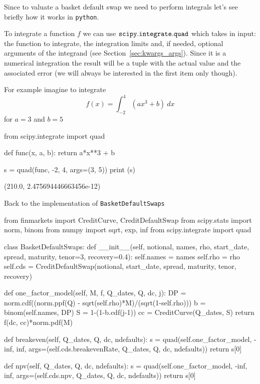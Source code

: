 Since to valuate a basket default swap we need to perform integrals let's see briefly how it works in \texttt{python}.

To integrate a function \(f\) we can use \(\tt{scipy.integrate.quad}\) which takes in
input: the function to integrate, the integration limits and, if needed, optional arguments of the integrand (see Section~\ref{sec:kwargs_args}). Since it is a numerical integration the result will be a tuple with the actual value and the associated error (we will always be interested in the first item only though).

For example imagine to integrate
\[f(x) = \int_{-2}^{4}(ax^{3} + b)~dx\]
for \(a=3\) and \(b=5\)

\begin{ipython}
from scipy.integrate import quad

def func(x, a, b):
    return a*x**3 + b

s = quad(func, -2, 4, args=(3, 5))
print (s)
\end{ipython}
\begin{ioutput}
(210.0, 2.475694446663456e-12)
\end{ioutput}

Back to the implementation of \texttt{BasketDefaultSwaps}

\begin{ipython}
from finmarkets import CreditCurve, CreditDefaultSwap
from scipy.stats import norm, binom
from numpy import sqrt, exp, inf
from scipy.integrate import quad

class BasketDefaultSwaps:
    def __init__(self, notional, names, rho, start_date, spread,
                 maturity, tenor=3, recovery=0.4):
        self.names = names
        self.rho = rho
        self.cds = CreditDefaultSwap(notional, start_date, spread,
        maturity, tenor, recovery)

    def one_factor_model(self, M, f, Q_dates, Q, dc, j):
        DP = norm.cdf((norm.ppf(Q) - sqrt(self.rho)*M)/(sqrt(1-self.rho)))
        b = binom(self.names, DP)
        S = 1-(1-b.cdf(j-1))
        cc = CreditCurve(Q_dates, S)
        return f(dc, cc)*norm.pdf(M)

    def breakeven(self, Q_dates, Q, dc, ndefaults):
        s = quad(self.one_factor_model, -inf, inf,
                 args=(self.cds.breakevenRate, Q_dates, Q, dc, ndefaults))
        return s[0]

    def npv(self, Q_dates, Q, dc, ndefaults):
        s = quad(self.one_factor_model, -inf, inf,
        args=(self.cds.npv, Q_dates, Q, dc, ndefaults))
        return s[0]
\end{ipython}

